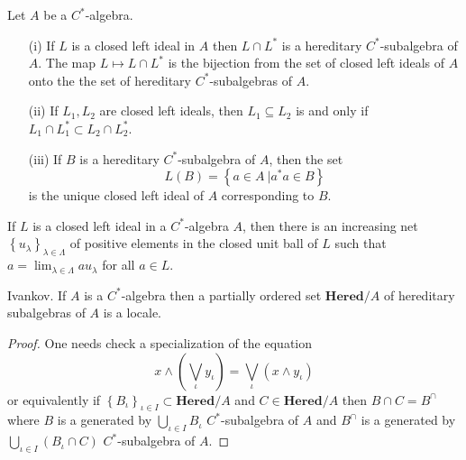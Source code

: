 \documentclass{beamer}
\theoremstyle{plain}
\newcommand{\be}{\begin{equation}}
\newcommand{\ee}{\end{equation}}
\newcommand{\la}{\lambda}
\newcommand{\La}{\Lambda}
\begin{document}
\begin{frame}
	\begin{lemma}\label{hered_ideal_lem}
	Let $A$ be a $C^*$-algebra.
	\begin{enumerate}
		\item[(i)] If $L$ is a closed left ideal in $A$ then $L\cap L^*$ is a hereditary $C^*$-subalgebra of $A$. The map $L \mapsto L\cap L^*$ is the bijection from the set of closed left ideals of $A$ onto the the set of hereditary $C^*$-subalgebras of $A$.
		\item[(ii)] If $L_1, L_2$ are closed left ideals, then $L_1 \subseteq L_2$ is and only if $L_1\cap L_1^* \subset L_2\cap L_2^*$.
		\item[(iii)] If $B$ is a hereditary $C^*$-subalgebra of $A$, then the set 
		\be\label{left_ideal_eqn}
		L\left(B \right) = \left\{\left.a \in A~\right| a^*a \in B\right\}
		\ee
		is the unique closed left ideal of $A$ corresponding to $B$.
	\end{enumerate}
\end{lemma}

\end{frame}
\begin{frame}
		\begin{theorem}\label{left_ideal_thm}
		If $L$ is a closed left ideal in a $C^*$-algebra $A$, then there
		is an increasing net $\left\{u_\la\right\}_{\la\in\La}$ of positive elements in the closed unit ball of
		$L$ such that $a = \lim_{\la\in \La}au_\la $ for all $a\in L$.
	\end{theorem}
\begin{lemma}\alert{Ivankov}.
If $A$ is a $C^*$-algebra then a partially ordered set  $\mathbf{Hered}/A$ of hereditary subalgebras of $A$ is a locale.
\end{lemma}
\begin{proof}
	One needs check a specialization of the equation	$$
	x \wedge \left( \bigvee_\iota y_\iota \right) = \bigvee_\iota\left(x\wedge   y_\iota \right) 
	$$
or equivalently if   $\left\{B_\iota\right\}_{\iota\in I} \subset  \mathbf{Hered}/A$ and $C \in \mathbf{Hered}/A$ then
$
B \cap C = B^\cap 
$ 
where  $B$ is a generated by $\bigcup_{\iota \in I} B_\iota$  $C^*${-subalgebra of } $A$ and $B^\cap$ is a generated by $\bigcup_{\iota \in I}\left(  B_\iota\cap C\right) $  $C^*${-subalgebra of } $A$.	
\end{proof}	
\end{frame}
\end{document}
